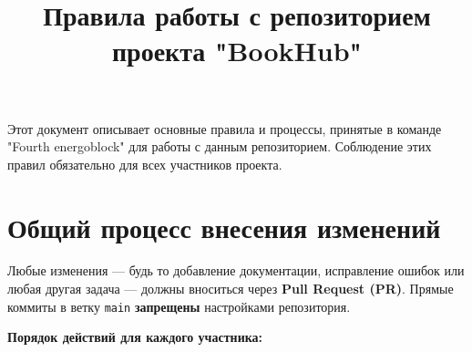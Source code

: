 \documentclass[12pt,a4paper]{article}
\title{\textbf{Правила работы с репозиторием проекта "BookHub"}}
\author{}
\date{}
\begin{document}
\maketitle

\vspace{1cm}

Этот документ описывает основные правила и процессы, принятые в команде "Fourth energoblock" для работы с данным репозиторием. Соблюдение этих правил обязательно для всех участников проекта.

\section{Общий процесс внесения изменений}

Любые изменения — будь то добавление документации, исправление ошибок или любая другая задача — должны вноситься через \textbf{Pull Request (PR)}. Прямые коммиты в ветку \texttt{main} \textbf{запрещены} настройками репозитория.

\textbf{Порядок действий для каждого участника:}
\end{document}
